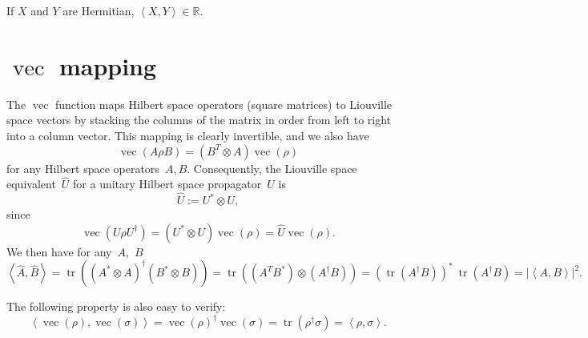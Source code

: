 \documentclass[aps, pra, a4paper, longbibliography]{revtex4}
\newcommand{\be}{\begin{equation}}
\newcommand{\ee}{\end{equation}}
\newcommand{\R}{{\mathbb R}}  %
\newcommand{\inprod}[2]{\left\langle #1, #2 \right\rangle}
\DeclareMathOperator{\tr}{tr}
\DeclareMathOperator{\cvec}{vec}
\begin{document}
If $X$ and $Y$ are Hermitian, $\inprod{X}{Y} \in \R$.

\section{$\cvec$ mapping}
\label{sec:vec}

The $\cvec$ function maps Hilbert space operators (square matrices) to
Liouville space vectors by stacking the columns of the matrix in order
from left to right into a column vector. This mapping is clearly
invertible, and we also have
\be
\cvec(A \rho B) = (B^T \otimes A) \cvec(\rho)
\ee
for any Hilbert space operators~$A, B$.
Consequently, the Liouville space equivalent~$\hat{U}$ for a unitary Hilbert space
propagator~$U$ is
\be
\label{eq:L-unitary}
\hat{U} := U^* \otimes U,
\ee
since
\be
\cvec(U \rho U^\dagger) = (U^* \otimes U) \cvec(\rho) = \hat{U} \cvec(\rho).
\ee
We then have for any~$A$,~$B$
\be
\label{eq:hat-product}
\inprod{\hat{A}}{\hat{B}}
= \tr((A^* \otimes A)^\dagger (B^* \otimes B))
= \tr((A^T B^*) \otimes (A^\dagger B))
= (\tr(A^\dagger B))^* \: \tr(A^\dagger B)
= |\inprod{A}{B}|^2.
\ee

The following property is also easy to verify:
\be
\inprod{\cvec(\rho)}{\cvec(\sigma)} = \cvec(\rho)^\dagger \cvec(\sigma)
= \tr(\rho^\dagger \sigma) = \inprod{\rho}{\sigma}.
\ee






\end{document}
